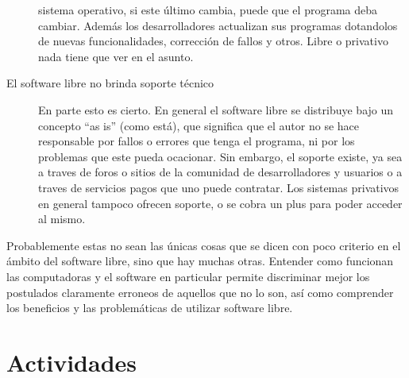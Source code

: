 \begin{description}
        sistema operativo, si este último cambia, puede que el programa deba
        cambiar. Además los desarrolladores actualizan sus programas dotandolos
        de nuevas funcionalidades, corrección de fallos y otros. Libre o
        privativo nada tiene que ver en el asunto.
    \item[El software libre no brinda soporte técnico]
        En parte esto es cierto. En general el software libre se distribuye
        bajo un concepto ``as is'' (como está), que significa que el autor
        no se hace responsable por fallos o errores que tenga el programa,
        ni por los problemas que este pueda ocacionar. Sin embargo, el soporte
        existe, ya sea a traves de foros o sitios de la comunidad de desarrolladores
        y usuarios o a traves de servicios pagos que uno puede contratar. Los
        sistemas privativos en general tampoco ofrecen soporte, o se cobra un
        plus para poder acceder al mismo.
\end{description}

Probablemente estas no sean las únicas cosas que se dicen con poco criterio en
el ámbito del software libre, sino que hay muchas otras. Entender como funcionan
las computadoras y el software en particular permite discriminar mejor los
postulados claramente erroneos de aquellos que no lo son, así como comprender
los beneficios y las problemáticas de utilizar software libre.

\section{Actividades}

